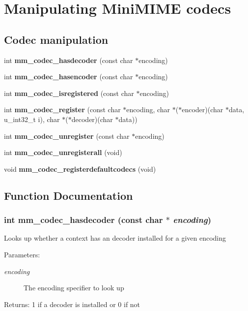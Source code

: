 \section{Manipulating Mini\-MIME codecs}
\label{group__codecs}
\subsection*{Codec manipulation}
\begin{CompactItemize}
\item 
int {\bf mm\_\-codec\_\-hasdecoder} (const char $\ast$encoding)
\item 
int {\bf mm\_\-codec\_\-hasencoder} (const char $\ast$encoding)
\item 
int {\bf mm\_\-codec\_\-isregistered} (const char $\ast$encoding)
\item 
int {\bf mm\_\-codec\_\-register} (const char $\ast$encoding, char $\ast$($\ast$encoder)(char $\ast$data, u\_\-int32\_\-t i), char $\ast$($\ast$decoder)(char $\ast$data))
\item 
int {\bf mm\_\-codec\_\-unregister} (const char $\ast$encoding)
\item 
int {\bf mm\_\-codec\_\-unregisterall} (void)
\item 
void {\bf mm\_\-codec\_\-registerdefaultcodecs} (void)
\end{CompactItemize}


\subsection{Function Documentation}
\subsubsection{\setlength{\rightskip}{0pt plus 5cm}int mm\_\-codec\_\-hasdecoder (const char $\ast$ {\em encoding})}\label{group__codecs_g6ccb0f7a1d7c870dc3dae04f31d6ccca}


Looks up whether a context has an decoder installed for a given encoding

\begin{Desc}
\item[Parameters:]
\begin{description}
\item[{\em encoding}]The encoding specifier to look up \end{description}
\end{Desc}
\begin{Desc}
\item[Returns:]1 if a decoder is installed or 0 if not \end{Desc}

